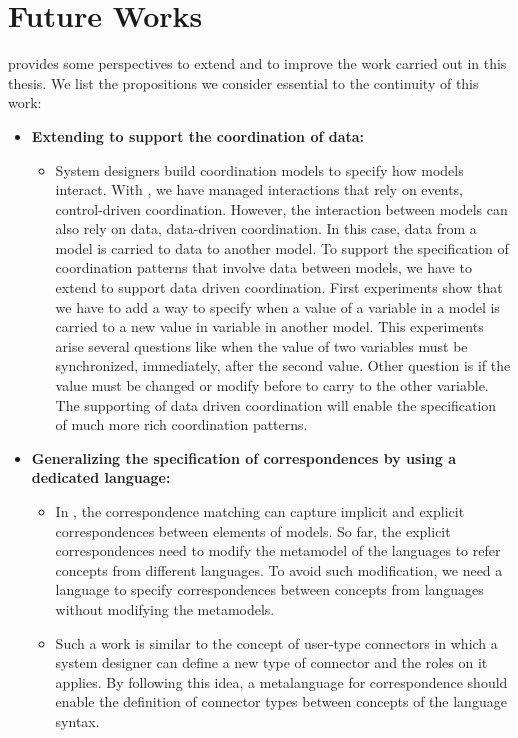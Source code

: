 \section{Future Works}
\bcool provides some perspectives to extend and to improve the work carried out in this thesis. We list the propositions we consider essential to the continuity of this work:

\begin{itemize}
	\item \textbf{Extending \bcool to support the coordination of data:} 
	\begin{itemize}
		\item System designers build coordination models to specify how models interact. With \bcool, we have managed interactions that rely on events, \ie control-driven coordination. However, the interaction between models can also rely on data, \ie data-driven coordination. In this case, data from a model is carried to data to another model. To support the specification of coordination patterns that involve data between models, we have to extend \bcool to support data driven coordination. First experiments show that we have to add a way to specify when a value of a variable in a model is carried to a new value in variable in another model. This experiments arise several questions like when the value of two variables must be synchronized, \eg immediately, after the second value. Other question is if the value must be changed or modify before to carry to the other variable. The supporting of data driven coordination will enable the specification of much more rich coordination patterns. 	 
	\end{itemize}
	
	\item \textbf{Generalizing the specification of correspondences by using a dedicated language:}
		\begin{itemize}
			\item In \bcool, the correspondence matching can capture implicit and explicit correspondences between elements of models. So far, the explicit correspondences need to modify the metamodel of the languages to refer concepts from different languages. To avoid such modification, we need a language to specify correspondences between concepts from languages without modifying the metamodels. 
			
			\item Such a work is similar to the concept of user-type connectors in which a system designer can define a new type of connector and the roles on it applies. By following this idea, a metalanguage for correspondence should enable the definition of connector types between concepts of the language syntax.  
			

\end{itemize}
\end{itemize}
